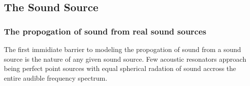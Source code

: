 \subsection{The Sound Source}

\subsubsection{The propogation of sound from real sound sources}

The first immidiate barrier to modeling the propogation of sound from a sound source is the nature of any given sound source. Few acoustic resonators approach being perfect point sources with equal spherical radation of sound accross the entire audible frequency spectrum. 